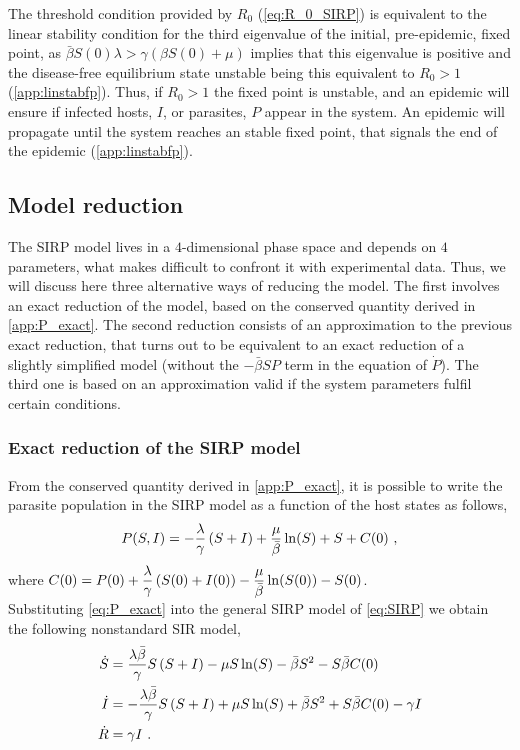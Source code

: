 The threshold condition provided by $R_0$ (\cref{eq:R_0_SIRP}) is
equivalent
to the linear stability condition for the third eigenvalue of the initial,
pre-epidemic, fixed point, as $\bar{\beta} S(0) \lambda>\gamma(\beta S(0)+\mu)$
implies that this eigenvalue is positive and the disease-free equilibrium
state unstable being this
equivalent to $R_0>1$ (\cref{app:linstabfp}).
Thus, if $R_0>1$ the fixed point is unstable, and an epidemic will ensure
if infected hosts, $I$, or parasites, $P$ appear in the system. An epidemic
will propagate until the system reaches an stable fixed point, that signals the
end of the epidemic (\cref{app:linstabfp}).

\subsection{Model reduction} \label{sec:reduction}

The SIRP model lives in a $4$-dimensional phase space and depends on $4$
parameters, what makes difficult to confront it with experimental data. Thus,
we will discuss here
three alternative ways of reducing the model. The first involves an exact
reduction of the model, based on the conserved quantity derived in
\cref{app:P_exact}. The second reduction consists of an approximation to the
previous exact reduction, that turns out to be equivalent to an exact reduction
of a slightly simplified model (without the $-\bar{\beta}SP$ term in the
equation of $\dot{P}$). The third one is based on an approximation valid if the
system parameters fulfil certain conditions.

\subsubsection{Exact reduction of the SIRP model} \label{sec:exactred}

From the conserved quantity derived in \cref{app:P_exact}, it is possible
to write the parasite population in the SIRP model as a function of the host
states as follows,
\begin{equation}\label{eq:P_exact}
    P(S,I)=-\frac{\lambda}{\gamma}\left(S+I\right) +
    \frac{\mu}{\bar{\beta}}\ln(S) + S + C(0) \ ,
\end{equation}
where $C(0)=P(0)+\displaystyle\frac{\lambda}{\gamma}\left(S(0)+I(0)\right) -
    \frac{\mu}{\bar{\beta}}\ln(S(0)) - S(0)$.\\

Substituting \cref{eq:P_exact} into the general SIRP model of
\cref{eq:SIRP} we obtain the following nonstandard SIR model,
\begin{equation}\label{eq:SIR_exact}
    \begin{aligned}
        \dot{S} & = \frac{\lambda\bar{\beta}}{\gamma}S\left(S+I\right) - \mu
        S\ln(S) - \bar{\beta} S^2 - S\bar{\beta} C(0)                        \\
        \dot{I} & = -\frac{\lambda\bar{\beta}}{\gamma}S\left(S+I\right) + \mu
        S\ln(S) + \bar{\beta} S^2 + S\bar{\beta} C(0) -\gamma I              \\
        \dot{R} & =\gamma I \ .
    \end{aligned}
\end{equation}

